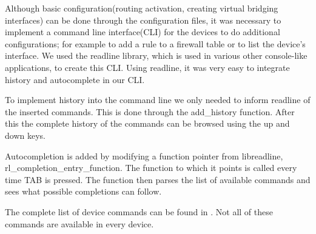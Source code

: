 Although basic configuration(routing activation, creating virtual bridging interfaces) can be done through the 
configuration files, it was necessary to implement a command line interface(CLI) for the devices to do additional configurations; 
for example to add a rule to a firewall table or to list the device's interface. We used the readline library, which is used in various
other console-like applications, to create this CLI. Using readline, it was very easy to integrate history and autocomplete in our CLI.

To implement history into the command line we only needed to inform readline of the inserted commands. This is done through the
add_history function. After this the complete history of the commands can be browsed using the up and down keys.

Autocompletion is added by modifying a function pointer from libreadline, rl_completion_entry_function. The function to which it points
is called every time TAB is pressed. The function then parses the list of available commands and sees what possible completions
can follow. 

The complete list of device commands can be found in . Not all of these commands are available in every device.
